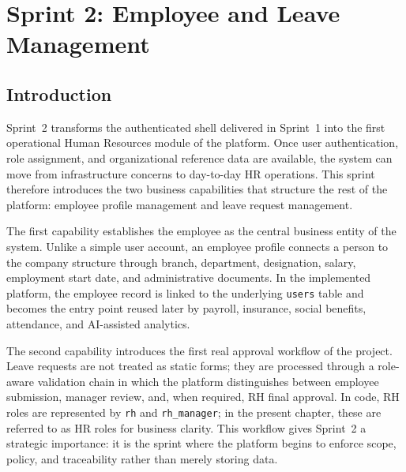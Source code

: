 
\chapter{Sprint 2: Employee and Leave Management}


\section{Introduction}\label{sec:s2_intro}

Sprint~2 transforms the authenticated shell delivered in Sprint~1 into the first operational
Human Resources module of the platform. Once user authentication, role assignment, and
organizational reference data are available, the system can move from infrastructure concerns
to day-to-day HR operations. This sprint therefore introduces the two business capabilities that
structure the rest of the platform: employee profile management and leave request management.

The first capability establishes the employee as the central business entity of the system.
Unlike a simple user account, an employee profile connects a person to the company structure
through branch, department, designation, salary, employment start date, and administrative
documents. In the implemented platform, the employee record is linked to the underlying
\texttt{users} table and becomes the entry point reused later by payroll, insurance, social
benefits, attendance, and AI-assisted analytics.

The second capability introduces the first real approval workflow of the project. Leave requests
are not treated as static forms; they are processed through a role-aware validation chain in
which the platform distinguishes between employee submission, manager review, and, when
required, RH final approval. In code, RH roles are represented by \texttt{rh} and
\texttt{rh\_manager}; in the present chapter, these are referred to as HR roles for business
clarity. This workflow gives Sprint~2 a strategic importance: it is the sprint where the
platform begins to enforce scope, policy, and traceability rather than merely storing data.

